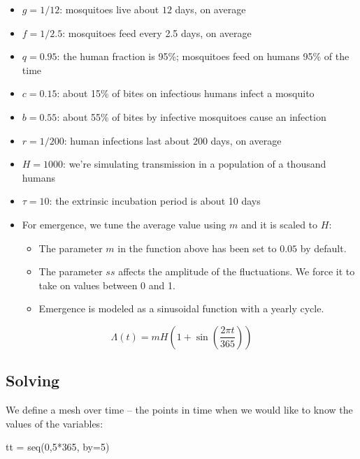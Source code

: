 \documentclass[
]{book}
\newenvironment{Shaded}{\begin{snugshade}}{\end{snugshade}}
\newcommand{\AttributeTok}[1]{\textcolor[rgb]{0.77,0.63,0.00}{#1}}
\newcommand{\DecValTok}[1]{\textcolor[rgb]{0.00,0.00,0.81}{#1}}
\newcommand{\FunctionTok}[1]{\textcolor[rgb]{0.00,0.00,0.00}{#1}}
\newcommand{\NormalTok}[1]{#1}
\newcommand{\OtherTok}[1]{\textcolor[rgb]{0.56,0.35,0.01}{#1}}
\newcommand{\SpecialCharTok}[1]{\textcolor[rgb]{0.00,0.00,0.00}{#1}}
\begin{document}
\begin{itemize}
\item
  \(g=1/12\): mosquitoes live about \(12\) days, on average
\item
  \(f=1/2.5\): mosquitoes feed every 2.5 days, on average
\item
  \(q=0.95\): the human fraction is 95\%; mosquitoes feed on humans 95\% of the time
\item
  \(c=0.15\): about 15\% of bites on infectious humans infect a mosquito
\item
  \(b=0.55\): about 55\% of bites by infective mosquitoes cause an infection
\item
  \(r=1/200\): human infections last about \(200\) days, on average
\item
  \(H=1000\): we're simulating transmission in a population of a thousand humans
\item
  \(\tau=10\): the extrinsic incubation period is about 10 days
\item
  For emergence, we tune the average value using \(m\) and it is scaled to \(H\):

  \begin{itemize}
  \item
    The parameter \(m\) in the function above has been set to \(0.05\) by default.
  \item
    The parameter \(ss\) affects the amplitude of the fluctuations. We force it to take on values between 0 and 1.
  \item
    Emergence is modeled as a sinusoidal function with a yearly cycle.
  \end{itemize}
\end{itemize}

\[\Lambda(t) = m H \left(1 + \sin \left(\frac{2\pi t}{365}\right)\right)\]

\hypertarget{solving}{%
\subsection{Solving}\label{solving}}

We define a mesh over time -- the points in time when we would like to know the values of the variables:

\begin{Shaded}
\begin{Highlighting}[]
\NormalTok{tt }\OtherTok{=} \FunctionTok{seq}\NormalTok{(}\DecValTok{0}\NormalTok{,}\DecValTok{5}\SpecialCharTok{*}\DecValTok{365}\NormalTok{, }\AttributeTok{by=}\DecValTok{5}\NormalTok{) }
\end{Highlighting}
\end{Shaded}
\end{document}
